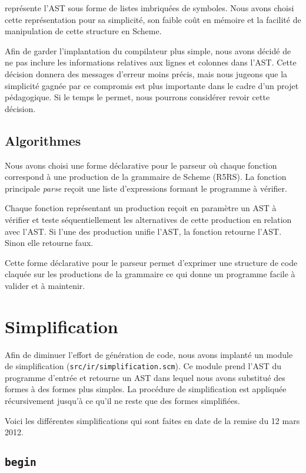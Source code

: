 \documentclass[11pt]{report}
\begin{document}
\sins{} représente l'AST sous forme de listes imbriquées de symboles. Nous
avons choisi cette représentation pour sa simplicité, son faible coût en
mémoire et la facilité de manipulation de cette structure en Scheme.

Afin de garder l'implantation du compilateur plus simple, nous avons
décidé de ne pas inclure les informations relatives aux lignes et
colonnes dans l'AST. Cette décision donnera des messages d'erreur
moins précis, mais nous jugeons que la simplicité gagnée par ce
compromis est plus importante dans le cadre d'un projet pédagogique.
Si le temps le permet, nous pourrons considérer revoir cette décision.

\subsection{Algorithmes}

Nous avons choisi une forme déclarative pour le parseur où chaque fonction
correspond à une production de la grammaire de Scheme (R5RS). La fonction
principale \emph{parse} reçoit une liste d'expressions formant le programme à
vérifier.

Chaque fonction représentant un production reçoit en paramètre un AST à
vérifier et teste séquentiellement les alternatives de cette production en
relation avec l'AST. Si l'une des production unifie l'AST, la fonction retourne
l'AST. Sinon elle retourne faux.

Cette forme déclarative pour le parseur permet d'exprimer une structure de
code claquée sur les productions de la grammaire ce qui donne un programme
facile à valider et à maintenir.


\section{Simplification}

Afin de diminuer l'effort de génération de code, nous avons implanté
un module de simplification ({\tt src/ir/simplification.scm}). Ce
module prend l'AST du programme d'entrée et retourne un AST dans
lequel nous avons substitué des formes à des formes plus simples. La
procédure de simplification est appliquée récursivement jusqu'à ce
qu'il ne reste que des formes simplifiées.

Voici les différentes simplifications qui sont faites en date de la
remise du 12 mars 2012.

\subsection{\tt begin}
\end{document}

